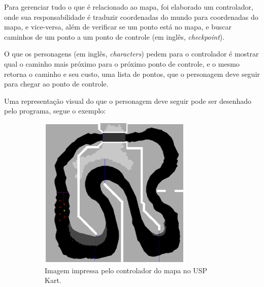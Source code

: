 Para gerenciar tudo o que é relacionado ao mapa, foi elaborado um controlador, onde sua responsabilidade é traduzir coordenadas do mundo para coordenadas do mapa, e vice-versa, além de verificar se um ponto está no mapa, e buscar caminhos de um ponto a um ponto de controle (em inglês, \textit{checkpoint}).

O que os personagens (em inglês, \textit{characters}) pedem para o controlador é mostrar qual o caminho mais próximo para o próximo ponto de controle, e o mesmo retorna o caminho e seu custo, uma lista de pontos, que o personagem deve seguir para chegar ao ponto de controle.

Uma representação visual do que o personagem deve seguir pode ser desenhado pelo programa, segue o exemplo:

\begin{figure}[H]
    \centering
    \begin{subfigure}[t]{0.45\textwidth}
        \centering
        \includegraphics[width=0.8\textwidth]{figuras/Mapa modelado.png}
        \caption{Imagem impressa pelo controlador do mapa no USP Kart.}
        \label{fig:mapa-modelado}
    \end{subfigure}
    \hfill
    \begin{subfigure}[t]{0.45\textwidth}
        \centering

\end{subfigure}
\end{figure}
